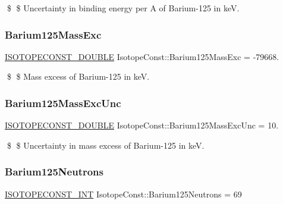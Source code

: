 \$ \$ Uncertainty in binding energy per A of Barium-\/125 in keV. \mbox{\label{group___isotope_const-_barium-_ba125_gab9ddf91b834cd328577fff5efc8731c1}} 
\subsubsection{\texorpdfstring{Barium125\+Mass\+Exc}{Barium125MassExc}}
{\footnotesize\ttfamily \mbox{\hyperlink{group___isotope_const-_macros_ga8f45a7272ce02c0b4c65c44636ed719a}{I\+S\+O\+T\+O\+P\+E\+C\+O\+N\+S\+T\+\_\+\+D\+O\+U\+B\+LE}} Isotope\+Const\+::\+Barium125\+Mass\+Exc = -\/79668.}

\$ \$ Mass excess of Barium-\/125 in keV. \mbox{\label{group___isotope_const-_barium-_ba125_gaff1042d1f24ca08ed5aa21545c00cb32}} 
\subsubsection{\texorpdfstring{Barium125\+Mass\+Exc\+Unc}{Barium125MassExcUnc}}
{\footnotesize\ttfamily \mbox{\hyperlink{group___isotope_const-_macros_ga8f45a7272ce02c0b4c65c44636ed719a}{I\+S\+O\+T\+O\+P\+E\+C\+O\+N\+S\+T\+\_\+\+D\+O\+U\+B\+LE}} Isotope\+Const\+::\+Barium125\+Mass\+Exc\+Unc = 10.}

\$ \$ Uncertainty in mass excess of Barium-\/125 in keV. \mbox{\label{group___isotope_const-_barium-_ba125_gade3b648c8cc0f7760cdc93e3ed49bbc9}} 
\subsubsection{\texorpdfstring{Barium125\+Neutrons}{Barium125Neutrons}}
{\footnotesize\ttfamily \mbox{\hyperlink{group___isotope_const-_macros_ga5f18360b3e99483a35c32d789e62621c}{I\+S\+O\+T\+O\+P\+E\+C\+O\+N\+S\+T\+\_\+\+I\+NT}} Isotope\+Const\+::\+Barium125\+Neutrons = 69}

